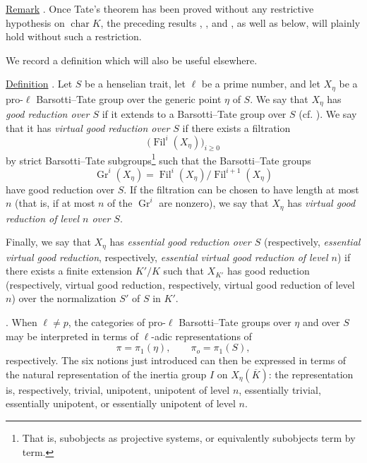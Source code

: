 \medskip
\noindent
\underline{Remark} . Once Tate's theorem has been proved without any
restrictive hypothesis on $\operatorname{char}K$, the preceding results
, , and , as well as  below, will plainly hold without
such a restriction.

We record a definition which will also be useful elsewhere.

\medskip
\noindent
\underline{Definition} . Let $S$ be a henselian trait, let $\ell$ be
a prime number, and let $X_\eta$ be a pro-$\ell$ Barsotti--Tate group
over the generic point $\eta$ of $S$. We say that $X_\eta$ has
\emph{good reduction over $S$} if it extends to a Barsotti--Tate group
over $S$ (cf. ). We say that it has \emph{virtual good reduction
over $S$} if there exists a filtration
\[
 \bigl(\operatorname{Fil}^i(X_\eta)\bigr)_{i\geq0}
\]
by strict Barsotti--Tate subgroups\footnote{That is, subobjects as
projective systems, or equivalently subobjects term by term.} such that
the Barsotti--Tate groups
\[
 \operatorname{Gr}^i(X_\eta)=
 \operatorname{Fil}^i(X_\eta)/\operatorname{Fil}^{i+1}(X_\eta)
\]
have good reduction over $S$. If the filtration can be chosen to have
length at most $n$ (that is, if at most $n$ of the
$\operatorname{Gr}^i$ are nonzero), we say that $X_\eta$ has
\emph{virtual good reduction of level $n$ over $S$}.

Finally, we say that $X_\eta$ has \emph{essential good reduction over
$S$} (respectively, \emph{essential virtual good reduction},
respectively, \emph{essential virtual good reduction of level $n$}) if
there exists a finite extension $K'/K$ such that $X_{K'}$ has good
reduction (respectively, virtual good reduction, respectively, virtual
good reduction of level $n$) over the normalization $S'$ of $S$ in
$K'$.

\medskip
\noindent
{}. When $\ell\neq p$, the categories of pro-$\ell$
Barsotti--Tate groups over $\eta$ and over $S$ may be interpreted in
terms of $\ell$-adic representations of
\[
 \pi=\pi_1(\eta), \qquad \pi_o=\pi_1(S),
\]
respectively. The six notions just introduced can then be expressed in
terms of the natural representation of the inertia group $I$ on
$X_\eta(\overline K)$: the representation is, respectively, trivial,
unipotent, unipotent of level $n$, essentially trivial, essentially
unipotent, or essentially unipotent of level $n$.

